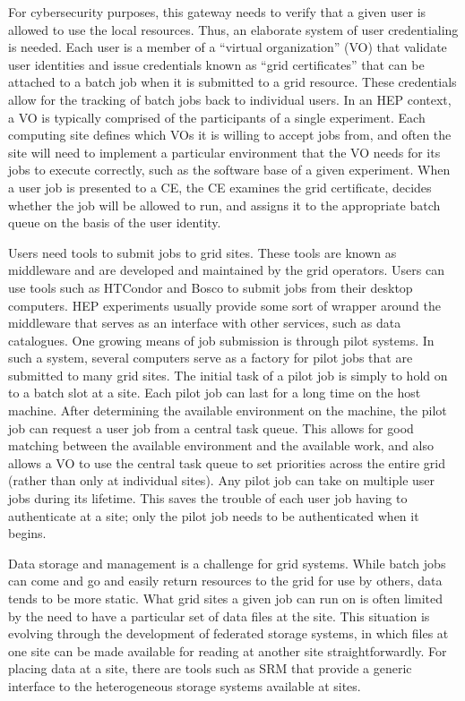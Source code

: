 For cybersecurity purposes, this gateway needs to verify that a given user is allowed to use the local resources.  Thus, an elaborate system of user credentialing is needed.  Each user is a member of a “virtual organization” (VO) that validate user identities and issue credentials known as “grid certificates” that can be attached to a batch job when it is submitted to a grid resource.  These credentials allow for the tracking of batch jobs back to individual users.  In an HEP context, a VO is typically comprised of the participants of a single experiment.  Each computing site defines which VOs it is willing to accept jobs from, and often the site will need to implement a particular environment that the VO needs for its jobs to execute correctly, such as the software base of a given experiment.  When a user job is presented to a CE, the CE examines the grid certificate, decides whether the job will be allowed to run, and assigns it to the appropriate batch queue on the basis of the user identity.

Users need tools to submit jobs to grid sites.  These tools are known as middleware and are developed and maintained by the grid operators.  Users can use tools such as HTCondor and Bosco to submit jobs from their desktop computers.  HEP experiments usually provide some sort of wrapper around the middleware that serves as an interface with other services, such as data catalogues.  One growing means of job submission is through pilot systems.  In such a system, several computers serve as a factory for pilot jobs that are submitted to many grid sites.  The initial task of a pilot job is simply to hold on to a batch slot at a site.  Each pilot job can last for a long time on the host machine.  After determining the available environment on the machine, the pilot job can request a user job from a central task queue.  This allows for good matching between the available environment and the available work, and also allows a VO to use the central task queue to set priorities across the entire grid (rather than only at individual sites).  Any pilot job can take on multiple user jobs during its lifetime.  This saves the trouble of each user job having to authenticate at a site; only the pilot job needs to be authenticated when it begins.

Data storage and management is a challenge for grid systems.  While batch jobs can come and go and easily return resources to the grid for use by others, data tends to be more static.  What grid sites a given job can run on is often limited by the need to have a particular set of data files at the site.  This situation is evolving through the development of federated storage systems, in which files at one site can be made available for reading at another site straightforwardly.  For placing data at a site, there are tools such as SRM that provide a generic interface to the heterogeneous storage systems available at sites.

